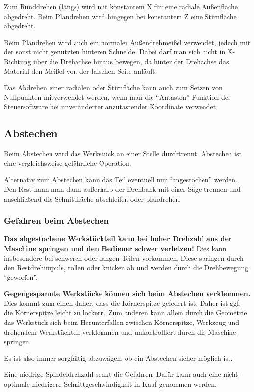 \documentclass{\basedir/fablab-document}
\begin{document}
Zum Runddrehen (längs) wird mit konstantem X für eine radiale Außenfläche abgedreht.
Beim Plandrehen wird hingegen bei konstantem Z eine Stirnfläche abgedreht. 

Beim Plandrehen wird auch ein normaler Außendrehmeißel verwendet, jedoch mit der sonst nicht genutzten hinteren Schneide. Dabei darf man sich nicht in X-Richtung über die Drehachse hinaus bewegen, da hinter der Drehachse das Material den Meißel von der falschen Seite anläuft.

Das Abdrehen einer radialen oder Stirnfläche kann auch zum Setzen von Nullpunkten mitverwendet werden, wenn man die \enquote{Antasten}-Funktion der Steuersoftware bei unveränderter anzutastender Koordinate verwendet.

\subsection{Abstechen}
Beim Abstechen wird das Werkstück an einer Stelle durchtrennt. Abstechen ist eine vergleichsweise gefährliche Operation.

Alternativ zum Abstechen kann das Teil eventuell nur \enquote{angestochen} werden. Den Rest kann man dann außerhalb der Drehbank mit einer Säge trennen und anschließend die Schnittfläche abschleifen oder plandrehen.

\subsubsection{Gefahren beim Abstechen}
\textbf{Das abgestochene Werkstückteil kann bei hoher Drehzahl aus der Maschine springen und den Bediener schwer verletzen!} Dies kann insbesondere bei schweren oder langen Teilen vorkommen. Diese springen durch den Restdrehimpuls, rollen oder knicken ab und werden durch die Drehbewegung \enquote{geworfen}.

\textbf{Gegengespannte Werkstücke können sich beim Abstechen verklemmen.} Dies kommt zum einen daher, dass die Körnerspitze gefedert ist. Daher ist ggf. die Körnerspitze leicht zu lockern. Zum anderen kann allein durch die Geometrie das Werkstück sich beim Herunterfallen zwischen Körnerspitze, Werkzeug und drehendem Werkstückteil verklemmen und unkontrolliert durch die Maschine springen.

Es ist also immer sorgfältig abzuwägen, ob ein Abstechen sicher möglich ist.

Eine niedrige Spindeldrehzahl senkt die Gefahren. Dafür kann auch eine nicht-optimale niedrigere Schnittgeschwindigkeit in Kauf genommen werden.
\end{document}
